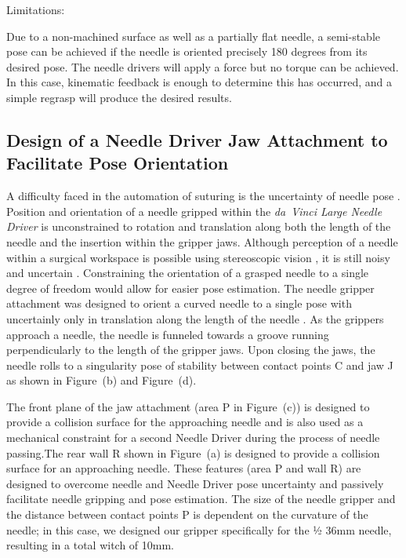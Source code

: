\documentclass[0-suturing.tex]{subfiles}
\begin{document}
Limitations: 

Due to a non-machined surface as well as a partially flat needle, a semi-stable pose can be achieved if the needle is oriented precisely 180 degrees from its desired pose. The needle drivers will apply a force but no torque can be achieved. In this case, kinematic feedback is enough to determine this has occurred, and a simple regrasp will produce the desired results. 

\subsection{Design of a Needle Driver Jaw Attachment to Facilitate Pose Orientation}

A difficulty faced in the automation of suturing is the uncertainty of needle pose \tocite. Position and orientation of a needle gripped within the \textit{da~Vinci Large Needle Driver} is unconstrained to rotation and translation along both the length of the needle and the insertion within the gripper jaws. Although perception of a needle within a surgical workspace is possible using stereoscopic vision \tocite, it is still noisy and uncertain \tocite. Constraining the orientation of a grasped needle to a single degree of freedom would allow for easier pose estimation. The needle gripper attachment was designed to orient a curved needle to a single pose with uncertainly only in translation along the length of the needle . As the grippers approach a needle, the needle is funneled towards a groove running perpendicularly to the length of the gripper jaws. Upon closing the jaws, the needle rolls to a singularity pose of stability between contact points C  and jaw J as shown in Figure~(b) and Figure~(d).

The front plane of the jaw attachment (area P  in Figure~(c)) is designed to provide a collision surface for the approaching needle and is also used as a mechanical constraint for a second Needle Driver during the process of needle passing.The rear wall R shown in Figure~(a)  is designed to provide a collision surface for an approaching needle. These features (area P and wall R) are designed to overcome needle and Needle Driver pose uncertainty and passively facilitate needle gripping and pose estimation. The size of the needle gripper and the distance between contact points P is dependent on the curvature of the needle; in this case, we designed our gripper specifically for the ½ 36mm needle, resulting in a total witch of 10mm.
\end{document}
